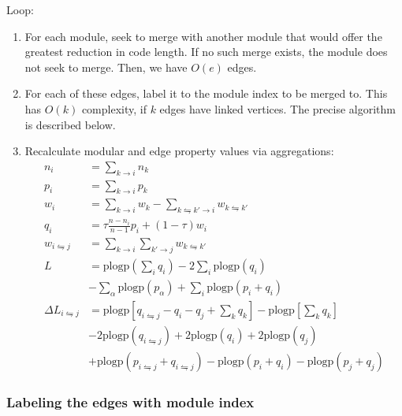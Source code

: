\documentclass[12pt,a4paper]{article}
\begin{document}
Loop:
\begin{enumerate}
    \item For each module, seek to merge with another module that would offer the greatest reduction in code length. If no such merge exists, the module does not seek to merge. Then, we have \(O(e)\) edges.
    \item For each of these edges, label it to the module index to be merged to. This has \(O(k)\) complexity, if \(k\) edges have linked vertices. The precise algorithm is described below.
    \item Recalculate modular and edge property values via aggregations:
        \begin{align*}
            n_i &= \sum_{k\rightarrow i} n_k\\
            p_i &= \sum_{k\rightarrow i} p_k\\
            w_i &= \sum_{k\rightarrow i} w_k -\sum_{k\leftrightharpoons k'\rightarrow i} w_{k\leftrightharpoons k'}\\
            q_i &= \tau\frac{n-n_i}{n-1}p_i +(1-\tau)w_i \\
            w_{i\leftrightharpoons j} &=
                \sum_{k\rightarrow i} \sum_{k'\rightarrow j} w_{k\leftrightharpoons k'} \\
            L &=
                \mathrm{plogp}\left( \sum_iq_i \right)
                -2\sum_i\mathrm{plogp}\left(q_i\right) \\
                & -\sum_\alpha \mathrm{plogp}(p_\alpha)
                +\sum_i\mathrm{plogp}\left( p_i+q_i \right) \\
            \Delta L_{i\leftrightharpoons j} &= \mathrm{plogp}\left[ q_{i\leftrightharpoons j}-q_i-q_j+\sum_k q_k \right] -\mathrm{plogp} \left[ \sum_k q_k \right] \\
    &-2 \mathrm{plogp}(q_{i\leftrightharpoons j}) +2\mathrm{plogp}(q_i) +2\mathrm{plogp}(q_j) \\
    &+\mathrm{plogp}(p_{i\leftrightharpoons j}+q_{i\leftrightharpoons j}) -\mathrm{plogp}(p_i+q_i) -\mathrm{plogp}(p_j+q_j)
    \end{align*}
\end{enumerate}

\subsubsection*{Labeling the edges with module index}
\end{document}
